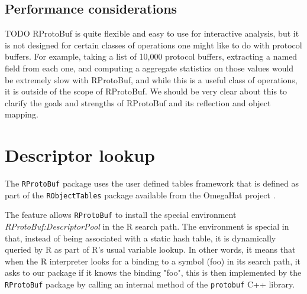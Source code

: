 \documentclass[article]{jss}
\begin{document}
\subsection{Performance considerations}

TODO RProtoBuf is quite flexible and easy to use for interactive
analysis, but it is not designed for certain classes of operations one
might like to do with protocol buffers.  For example, taking a list of
10,000 protocol buffers, extracting a named field from each one, and
computing a aggregate statistics on those values would be extremely
slow with RProtoBuf, and while this is a useful class of operations,
it is outside of the scope of RProtoBuf.  We should be very clear
about this to clarify the goals and strengths of RProtoBuf and its
reflection and object mapping.


\section{Descriptor lookup}
\label{sec-lookup}

The \texttt{RProtoBuf} package uses the user defined tables framework
that is defined as part of the \texttt{RObjectTables} package available
from the OmegaHat project \citep{RObjectTables}.

The feature allows \texttt{RProtoBuf} to install the
special environment \emph{RProtoBuf:DescriptorPool} in the R search path.
The environment is special in that, instead of being associated with a
static hash table, it is dynamically queried by R as part of R's usual
variable lookup. In other words, it means that when the R interpreter
looks for a binding to a symbol (foo) in its search path,
it asks to our package if it knows the binding "foo", this is then
implemented by the \texttt{RProtoBuf} package by calling an internal
method of the \texttt{protobuf} C++ library.



\end{document}
